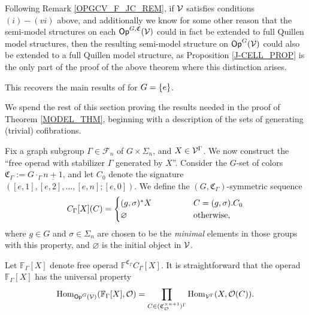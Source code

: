 \documentclass[a4paper,10pt
,draft
]{article}%
\renewcommand{\F}{\mathcal F}
\renewcommand{\1}{\eta}%
\begin{document}

\begin{remark}
      \label{OPGCV_FULL_REM}
      Following Remark \ref{OPGCV_F_JC_REM}, if $\mathcal V$ satisfies conditions $(i) - (vi)$ above,
      and additionally we know for some other reason that
      the semi-model structures on each $\mathsf{Op}^{G, \mathfrak C}(\mathcal V)$ could in fact be extended to full Quillen model structures,
      then the resulting semi-model structure on $\mathsf{Op}^G(\mathcal V)$ could also be extended to a full Quillen model structure,
      as Proposition \ref{J-CELL_PROP} is the only part of the proof of the above theorem where this distinction arises.
\end{remark}

\begin{remark}
      This recovers the main results of \cite{BM13, Cav} for $G = \left\{e\right\}$. 
\end{remark}



We spend the rest of this section proving the results needed in the proof of Theorem \ref{MODEL_THM},
beginning with a description of the sets of generating (trivial) cofibrations.

Fix a graph subgroup $\Gamma \in \F_n$ of $G \times \Sigma_n$, and $X \in \mathcal V^\Gamma$.
We now construct the ``free operad with stabilizer $\Gamma$ generated by $X$''.
Consider the $G$-set of colors $\mathfrak C_\Gamma := G \cdot_\Gamma \underline{n+1}$,
and let $C_0$ denote the signature $([e,1],[e,2],\dots,[e,n];[e,0])$.
We define the $(G,\mathfrak C_\Gamma)$-symmetric sequence
\begin{equation}
      C_\Gamma[X](C) =
      \begin{cases}
            (g,\sigma)^{\**} X \qquad \qquad & C = (g,\sigma).C_0
            \\
            \varnothing & \mbox{otherwise,}
      \end{cases}
\end{equation}
where $g \in G$ and $\sigma \in \Sigma_n$ are chosen to be the \textit{minimal} elements in those groups with this property,
and $\varnothing$ is the initial object in $\mathcal V$.

Let $\mathbb F_\Gamma[X]$ denote free operad $\mathbb F^{\mathfrak C_\Gamma} C_\Gamma[X]$.
It is straightforward that the operad $\mathbb F_\Gamma[X]$ has the universal property
\begin{equation}
      \operatorname{Hom}_{\mathsf{Op}^G(\mathcal V)}(\mathbb F_\Gamma[X], \mathcal{O}) = \mathop\prod\limits_{C \in (\mathfrak C_{\mathcal{O}}^{\times n+1})^\Gamma}\operatorname{Hom}_{\mathcal V^\Gamma}(X, \mathcal{O}(C)).
\end{equation}
\end{document}

